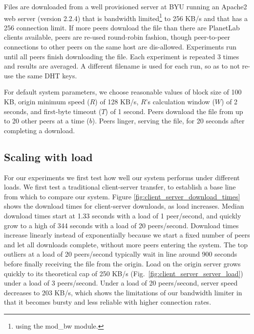 Files are downloaded from a well provisioned server at BYU running an Apache2 web server (version 2.2.4) that is
bandwidth limited\footnote{using the mod\_bw module.} to 256 KB/s and that has a 256 connection limit. 
If more peers download the file than there are PlanetLab clients available, peers are re-used round-robin fashion, though peer-to-peer connections 
to other peers on the same host are dis-allowed.  Experiments run until all peers finish downloading the file. 
Each experiment is repeated 3 times and results are averaged.  A different filename is used for each run, so as to not re-use the same DHT keys.

For default system parameters, we choose reasonable values 
of block size of 100 KB, origin minimum speed ($R$) of 128 KB/s, $R$'s calculation window ($W$) 
of 2 seconds, and first-byte timeout ($T$) of 1 second.  Peers download the file from up to 20 other peers at a time ($b$).
Peers linger, serving the file, for 20 seconds after completing a download.

\subsection{Scaling with load}

For our experiments we first test how well our system performs under different loads.
We first test a traditional client-server transfer, to establish a base line from which to compare 
our system. Figure \ref{fig:client_server_download_times} shows the download times for client-server 
downloads, as load increases.  Median download times start at 1.33 seconds with a load of 1 peer/second,
and quickly grow to a high of 344 seconds with a load of 20 peers/second. Download times increase linearly instead 
of exponentially because we start a fixed number of peers and let all downloads complete, without more peers
entering the system.
The top outliers at a load of 20 peers/second typically wait in line around 900 seconds before 
finally receiving the file from the origin. Load on the origin server grows quickly to its 
theoretical cap of 250 KB/s (Fig.~\ref{fig:client_server_server_load}) 
under a load of 3 peers/second. Under a load of 20 peers/second, server speed decreases to 203 KB/s, which 
shows the limitations of our bandwidth limiter in that it becomes bursty and less reliable with higher connection rates.

